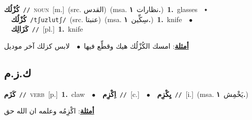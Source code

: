 \documentclass[10pt,a4paper,twoside]{article} %
\begin{document}
\begin{multicols}{2}
{\setlength\topsep{0pt}\textbf{\foreignlanguage{arabic}{كُزْلُك}}\ {\color{gray}\texttt{//}\color{black}}\ \textsc{noun}\ [m.]\ (src. \color{gray}\foreignlanguage{arabic}{القدس}\color{black})\ \color{gray}(msa. \foreignlanguage{arabic}{نظارات}~\foreignlanguage{arabic}{\textbf{١.}})\color{black}\ \textbf{1.}~glasses\ \ $\smblkdiamond$\ \ \setlength\topsep{0pt}\textbf{\foreignlanguage{arabic}{كُزْلُك}}\ {\color{gray}\texttt{/tʃuzlutʃ/}\color{black}}\ (src. \color{gray}\foreignlanguage{arabic}{عنبتا}\color{black})\ \color{gray}(msa. \foreignlanguage{arabic}{سِكِّين}~\foreignlanguage{arabic}{\textbf{١.}})\color{black}\ \textbf{1.}~knife\ \ $\bullet$\ \ \setlength\topsep{0pt}\textbf{\foreignlanguage{arabic}{كَزَالِك}}\ {\color{gray}\texttt{//}\color{black}}\ [pl.]\ \textbf{1.}~knife\  \begin{flushright}\color{gray}\foreignlanguage{arabic}{\textbf{\underline{\foreignlanguage{arabic}{أمثلة}}}: امسك الكُزْلُك هيك وقطِّع فيها\ $\bullet$\ \  لابس كزلك آخر موديل}\end{flushright}\color{black}} \vspace{2mm}

\vspace{-3mm}
\subsection*{\color{blue}\foreignlanguage{arabic}{ك.ز.م}\color{blue}{}} 

{\setlength\topsep{0pt}\textbf{\foreignlanguage{arabic}{كَزَم}}\ {\color{gray}\texttt{//}\color{black}}\ \textsc{verb}\ [p.]\ \textbf{1.}~claw\ \ $\bullet$\ \ \setlength\topsep{0pt}\textbf{\foreignlanguage{arabic}{اِكْزِم}}\ {\color{gray}\texttt{//}\color{black}}\ [c.]\ \ $\bullet$\ \ \setlength\topsep{0pt}\textbf{\foreignlanguage{arabic}{يِكْزِم}}\ {\color{gray}\texttt{//}\color{black}}\ [i.]\ \color{gray}(msa. \foreignlanguage{arabic}{يَخْمِش}~\foreignlanguage{arabic}{\textbf{١.}})\color{black}\  \begin{flushright}\color{gray}\foreignlanguage{arabic}{\textbf{\underline{\foreignlanguage{arabic}{أمثلة}}}: اكْزِمُه وعلمه ان الله حق}\end{flushright}\color{black}} \vspace{2mm}


\end{multicols}
\end{document}
